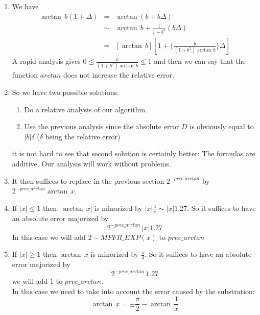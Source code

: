 \documentclass[12pt]{amsart}
\begin{document}
\begin{enumerate}
\item We have
\begin{equation*}
\begin{array}{rcl}
\arctan\,b(1+\Delta)
&=&\arctan(b+b\Delta)\\
&\sim&\arctan\,b+\frac{1}{1+b^2}(b\Delta)\\
&=&[\arctan\,b][1+\{\frac{b}{(1+b^2)\arctan\,b}\}\Delta]
\end{array}
\end{equation*}
A rapid analysis gives $0\leq \frac{b}{(1+b^2)\arctan\,b}\leq 1$ and then we can say that the function $arctan$ does not increase the relative error.
\item So we have two possible solutions:
\begin{enumerate}
\item Do a relative analysis of our algorithm.
\item Use the previous analysis since the absolute error $D$ is obviously equal to $|b|\delta$ ($\delta$ being the relative error)
\end{enumerate}
it is not hard to see that second solution is certainly better: The formulas are additive. Our analysis will work without problems.
\item It then suffices to replace in the previous section $2^{-prec\_arctan}$ by $2^{-prec\_arctan}\arctan\,x$.
\item If $|x|\leq 1$ then $|\arctan\,x|$ is minorized by $|x|\frac{4}{\pi}\sim |x|1.27$. So it suffices to have an absolute error majorized by
\begin{equation*}
2^{-prec\_arctan}\,|x|1.27
\end{equation*}
In this case we will add $2-MPFR\_EXP(x)$ to $prec\_arctan$
\item If $|x|\geq 1$ then $\arctan\,x$ is minorized by $\frac{\pi}{4}$. So it suffices to have an absolute error majorized by
\begin{equation*}
2^{-prec\_arctan}\, 1.27
\end{equation*}
we will add $1$ to $prec\_arctan$.\\
In this case we need to take into account the error caused by the substration:
\begin{equation*}
\arctan\,x=\pm\frac{\pi}{2}-\arctan\,\frac{1}{x}
\end{equation*}


\end{enumerate}
\end{document}
